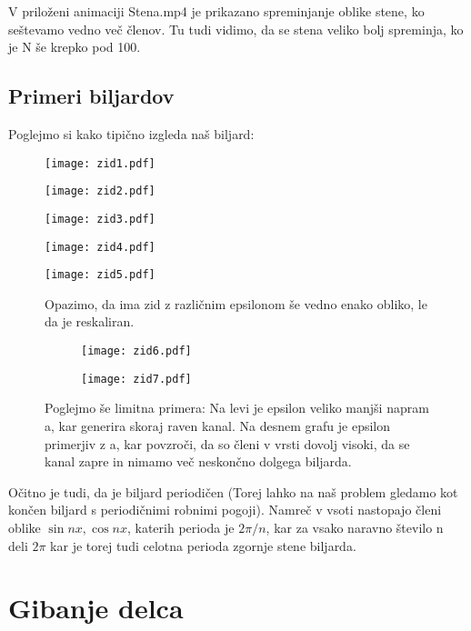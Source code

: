 \documentclass{article}
\begin{document}
V priloženi animaciji Stena.mp4 je prikazano spreminjanje oblike stene, ko seštevamo vedno več členov. Tu tudi vidimo, da se stena veliko bolj spreminja, ko je N še krepko pod 100. 

\subsection{Primeri biljardov}
Poglejmo si kako tipično izgleda naš biljard:
\begin{figure}[H]
\texttt{[image: zid1.pdf]}
\end{figure}
\begin{figure}[H]
\texttt{[image: zid2.pdf]}
\end{figure}
\begin{figure}[H]
\texttt{[image: zid3.pdf]}
\end{figure}
\begin{figure}[H]
\texttt{[image: zid4.pdf]}
\end{figure}
\begin{figure}[H]
\texttt{[image: zid5.pdf]}
\caption*{Opazimo, da ima zid z različnim epsilonom še vedno enako obliko, le da je reskaliran.}
\end{figure}

\begin{figure}[H]
\centering
\begin{subfigure}{.49\textwidth}
\texttt{[image: zid6.pdf]}
\end{subfigure}
\begin{subfigure}{.49\textwidth}
\texttt{[image: zid7.pdf]}
\end{subfigure}
\caption*{Poglejmo še limitna primera: Na levi je epsilon veliko manjši napram a, kar generira skoraj raven kanal. Na desnem grafu je epsilon primerjiv z a, kar povzroči, da so členi v vrsti dovolj visoki, da se kanal zapre in nimamo več neskončno dolgega biljarda.}
\end{figure}

Očitno je tudi, da je biljard periodičen (Torej lahko na naš problem gledamo kot končen biljard s periodičnimi robnimi pogoji). Namreč v vsoti nastopajo členi oblike $\sin nx, \cos nx$, katerih perioda je $2 \pi / n$, kar za vsako naravno število n deli $2 \pi$ kar je torej tudi celotna perioda zgornje stene biljarda. 
\section{Gibanje delca}
\end{document}
